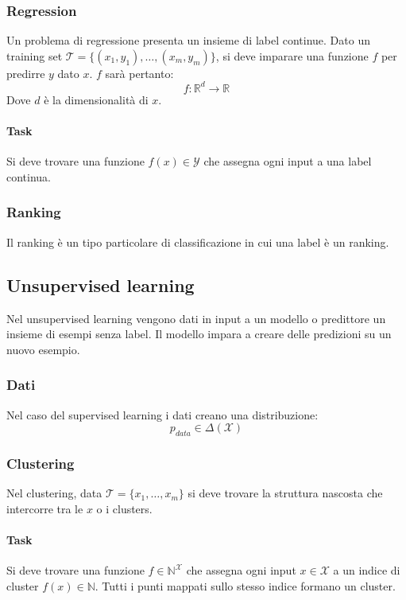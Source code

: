 		\subsubsection{Regression}
		Un problema di regressione presenta un insieme di label continue.
		Dato un training set $\mathcal{T}=\{(x_1, y_1),\dots,(x_m,y_m)\}$, si deve imparare una funzione $f$ per predirre $y$ dato $x$.
		$f$ sar\`a pertanto:
		$$f:\mathbb{R}^d\rightarrow\mathbb{R}$$
		Dove $d$ \`e la dimensionalit\`a di $x$.

			\paragraph{Task}
			Si deve trovare una funzione $f(x)\in\mathcal{Y}$ che assegna ogni input a una label continua.

		\subsubsection{Ranking}
		Il ranking \`e un tipo particolare di classificazione in cui una label \`e un ranking.

	\subsection{Unsupervised learning}
	Nel unsupervised learning vengono dati in input a un modello o predittore un insieme di esempi senza label.
	Il modello impara a creare delle predizioni su un nuovo esempio.

		\subsubsection{Dati}
		Nel caso del supervised learning i dati creano una distribuzione:
		$$p_{data}\in\Delta(\mathcal{X})$$

		\subsubsection{Clustering}
		Nel clustering, data $\mathcal{T}=\{x_1, \dots, x_m\}$ si deve trovare la struttura nascosta che intercorre tra le $x$ o i clusters.

			\paragraph{Task}
			Si deve trovare una funzione $f\in\mathbb{N}^{\mathcal{X}}$ che assegna ogni input $x\in\mathcal{X}$ a un indice di cluster $f(x)\in\mathbb{N}$.
			Tutti i punti mappati sullo stesso indice formano un cluster.

